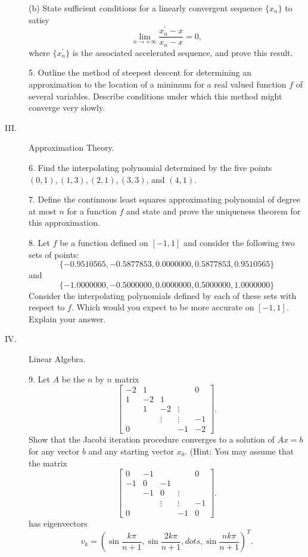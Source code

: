\documentclass{article}
\begin{document}
\begin{description}
\item[\qquad] (b)
State sufficient conditions for a linearly convergent sequence
$\{x_n\}$ to satisy
$$\lim_{n \to +\infty} \frac{x^\prime_n - x}{x_n - x} = 0,$$
where $\{x^\prime_n\}$ is the associated accelerated sequence, and prove this
result.

\item[\quad] 5.
Outline the method of steepest descent for determining an approximation to
the location of a minimum for a real valued function $f$ of several variables.
Describe conditions under which this method might converge very slowly.

\item[III.]
Approximation Theory.

\item[\quad] 6.
Find the interpolating polynomial determined by the five points
$(0,1), (1,3), (2,1), (3,3)$, and $(4,1)$.

\item[\quad] 7.
Define the continuous least squares approximating polynomial of degree at
most $n$ for a function $f$ and state and prove the uniqueness theorem for
this approximation.

\item[\quad] 8.
Let $f$ be a function defined on $[-1,1]$ and consider the following two
sets of points:
$$\{-0.9510565, -0.5877853, 0.0000000, 0.5877853, 0.9510565\}$$
and
$$\{-1.0000000, -0.5000000, 0.0000000, 0.5000000, 1.0000000\}$$
Consider the interpolating polynomials defined by each of these sets with
respect to $f$. Which would you expect to be more accurate on $[-1,1]$.
Explain your answer.

\item[IV.]
Linear Algebra.

\item[\quad] 9.
Let $A$ be the $n$ by $n$ matrix
$$\left[\begin{array}{ccccc}
        -2 & 1 &&& 0 \\
        1 & -2 & 1 & \\
        & 1& -2& \vdots & \\
        && \vdots & \vdots &-1 \\
        0 &&& -1& -2
        \end{array}
        \right].$$
Show that the Jacobi iteration procedure converges to a solution of
$Ax=b$ for any vector $b$ and any starting vector $x_0$. (Hint: You may
assume that the matrix
$$\left[\begin{array}{ccccc}
        0&-1&&&0 \\
        -1&0&-1&&\\
        &-1&0&\vdots & \\
        && \vdots & \vdots & -1 \\
        0 &&& -1& 0
        \end{array}
        \right].$$
has eigenvectors
$$v_k = \left(\sin \frac{k \pi}{n+1}, \sin \frac{2k\pi}{n+1}, dots,
  \sin \frac{nk\pi}{n+1} \right)^T.$$


\end{description}
\end{document}
